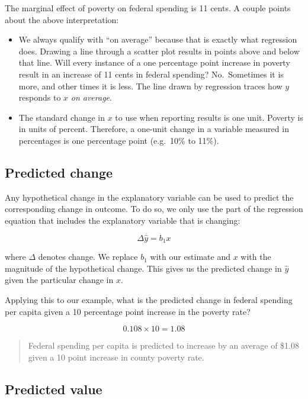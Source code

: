 \documentclass[
]{book}
\providecommand{\tightlist}{%
  \setlength{\itemsep}{0pt}\setlength{\parskip}{0pt}}
\begin{document}
The marginal effect of poverty on federal spending is 11 cents. A couple points about the above interpretation:

\begin{itemize}
\tightlist
\item
  We always qualify with ``on average'' because that is exactly what regression does. Drawing a line through a scatter plot results in points above and below that line. Will every instance of a one percentage point increase in poverty result in an increase of 11 cents in federal spending? No.~Sometimes it is more, and other times it is less. The line drawn by regression traces how \(y\) responds to \(x\) \emph{on average}.
\item
  The standard change in \(x\) to use when reporting results is one unit. Poverty is in units of percent. Therefore, a one-unit change in a variable measured in percentages is one percentage point (e.g.~10\% to 11\%).
\end{itemize}

\hypertarget{predicted-change}{%
\subsection{Predicted change}\label{predicted-change}}

Any hypothetical change in the explanatory variable can be used to predict the corresponding change in outcome. To do so, we only use the part of the regression equation that includes the explanatory variable that is changing:

\begin{equation}
\Delta \hat{y}=b_1x
\label{eq:predchange}
\end{equation}

where \(\Delta\) denotes change. We replace \(b_1\) with our estimate and \(x\) with the magnitude of the hypothetical change. This gives us the predicted change in \(\hat{y}\) given the particular change in \(x\).

Applying this to our example, what is the predicted change in federal spending per capita given a 10 percentage point increase in the poverty rate?

\[0.108 \times 10 = 1.08\]

\begin{quote}
Federal spending per capita is predicted to increase by an average of \$1.08 given a 10 point increase in county poverty rate.
\end{quote}

\hypertarget{predicted-value}{%
\subsection{Predicted value}\label{predicted-value}}
\end{document}
